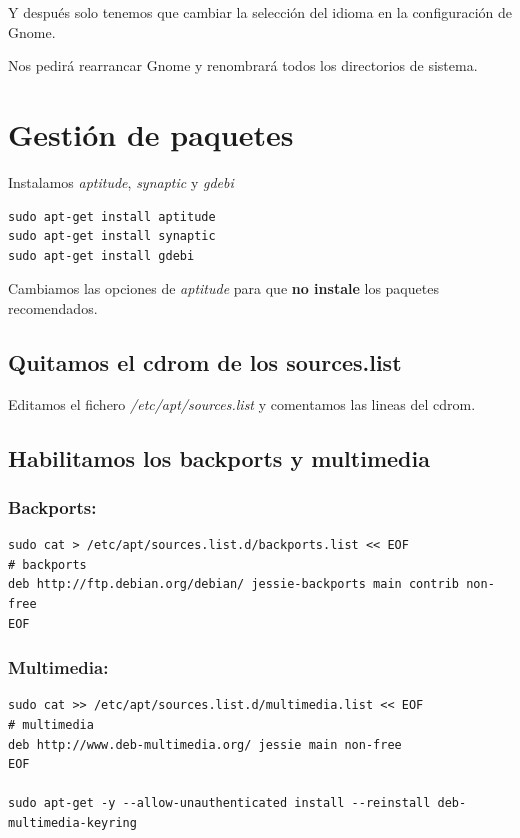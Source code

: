 \documentclass[12pt,spanish,]{article}
\begin{document}
Y después solo tenemos que cambiar la selección del idioma en la
configuración de Gnome.

Nos pedirá rearrancar Gnome y renombrará todos los directorios de
sistema.

\section{Gestión de paquetes}\label{gestiuxf3n-de-paquetes}

Instalamos \emph{aptitude}, \emph{synaptic} y \emph{gdebi}

\begin{verbatim}
sudo apt-get install aptitude
sudo apt-get install synaptic
sudo apt-get install gdebi
\end{verbatim}

Cambiamos las opciones de \emph{aptitude} para que \textbf{no instale}
los paquetes recomendados.

\subsection{Quitamos el cdrom de los
sources.list}\label{quitamos-el-cdrom-de-los-sources.list}

Editamos el fichero \emph{/etc/apt/sources.list} y comentamos las lineas
del cdrom.

\subsection{Habilitamos los backports y
multimedia}\label{habilitamos-los-backports-y-multimedia}

\subsubsection{Backports:}\label{backports}

\begin{verbatim}
sudo cat > /etc/apt/sources.list.d/backports.list << EOF
# backports
deb http://ftp.debian.org/debian/ jessie-backports main contrib non-free
EOF
\end{verbatim}

\subsubsection{Multimedia:}\label{multimedia}

\begin{verbatim}
sudo cat >> /etc/apt/sources.list.d/multimedia.list << EOF
# multimedia
deb http://www.deb-multimedia.org/ jessie main non-free
EOF

sudo apt-get -y --allow-unauthenticated install --reinstall deb-multimedia-keyring
\end{verbatim}
\end{document}
